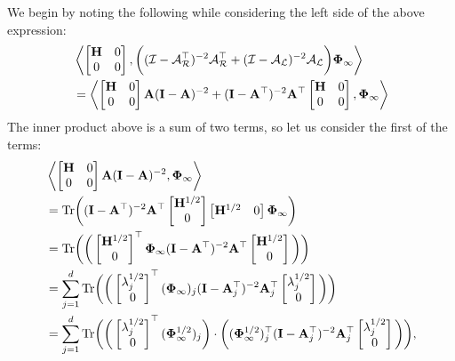 We begin by noting the following while considering the left side of the above expression:
\begin{align*}
&\left\langle \begin{bmatrix}\mathbf{H}&0\\0&0\end{bmatrix},  \bigg((\mathcal{I}-\mathcal{A}_{\mathcal{R}}^{\top})^{-2}\mathcal{A}_{\mathcal{R}}^{\top}+(\mathcal{I}-\mathcal{A}_{\mathcal{L}})^{-2}\mathcal{A}_{\mathcal{L}}\bigg)\boldsymbol{\Phi}_{\infty} \right\rangle\\
&=\left\langle \begin{bmatrix}\mathbf{H}&0\\0&0\end{bmatrix}\mathbf{A}(\mathbf{I}-\mathbf{A})^{-2}+(\mathbf{I}-\mathbf{A}^{\top})^{-2}\mathbf{A}^{\top}\begin{bmatrix}\mathbf{H}&0\\0&0\end{bmatrix}, \boldsymbol{\Phi}_{\infty} \right\rangle
\end{align*}
The inner product above is a sum of two terms, so let us consider the first of the terms:
\begin{align*}
&\left\langle \begin{bmatrix}\mathbf{H}&0\\0&0\end{bmatrix}\mathbf{A}(\mathbf{I}-\mathbf{A})^{-2}, \boldsymbol{\Phi}_{\infty} \right\rangle\\
&=\text{Tr}\bigg((\mathbf{I}-\mathbf{A}^{\top})^{-2}\mathbf{A}^{\top}\begin{bmatrix}\mathbf{H}^{1/2}\\0\end{bmatrix}\begin{bmatrix}\mathbf{H}^{1/2}&0\end{bmatrix}\boldsymbol{\Phi}_{\infty} \bigg)\\
&=\text{Tr}\bigg(\bigg(\begin{bmatrix}\mathbf{H}^{1/2}\\0\end{bmatrix}^{\top}\boldsymbol{\Phi}_{\infty} (\mathbf{I}-\mathbf{A}^{\top})^{-2}\mathbf{A}^{\top}\begin{bmatrix}\mathbf{H}^{1/2}\\0\end{bmatrix}\bigg)\bigg) \\
&=\sum_{j=1}^{d}\text{Tr}\bigg(\bigg(\begin{bmatrix}\lambda_j^{1/2}\\0\end{bmatrix}^{\top} (\boldsymbol{\Phi}_{\infty})_j (\mathbf{I}-\mathbf{A}_j^{\top})^{-2}\mathbf{A}_j^{\top}\begin{bmatrix}\lambda_j^{1/2}\\0\end{bmatrix}\bigg)\bigg) \\
&=\sum_{j=1}^{d}\text{Tr}\bigg(\bigg(\begin{bmatrix}\lambda_j^{1/2}\\0\end{bmatrix}^{\top}(\boldsymbol{\Phi}_{\infty}^{1/2})_j\bigg)\cdot\bigg((\boldsymbol{\Phi}_{\infty}^{1/2})_j^{\top}(\mathbf{I}-\mathbf{A}_j^{\top})^{-2}\mathbf{A}_j^{\top}\begin{bmatrix}\lambda_j^{1/2}\\0\end{bmatrix}\bigg)\bigg),
\end{align*}
